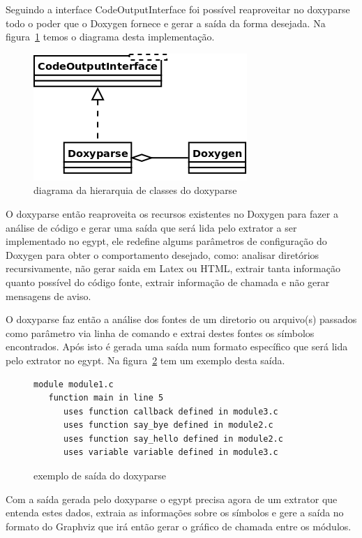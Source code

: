 Seguindo a interface CodeOutputInterface foi possível reaproveitar no doxyparse
todo o poder que o Doxygen fornece e gerar a saída da forma desejada. Na
figura~\ref{doxyparse-diagram} temos o diagrama desta implementação.

\begin{figure}[h]
\center
\includegraphics[scale=0.4]{imagens/doxyparse-diagram}
\caption{diagrama da hierarquia de classes do doxyparse}
\label{doxyparse-diagram}
\end{figure}

O doxyparse então reaproveita os recursos existentes no Doxygen para fazer a
análise de código e gerar uma saída que será lida pelo extrator a ser
implementado no egypt, ele redefine algums parâmetros de configuração
do Doxygen para obter o comportamento desejado, como: analisar diretórios
recursivamente, não gerar saida em Latex ou HTML, extrair tanta informação
quanto possível do código fonte, extrair informação de chamada e não gerar
mensagens de aviso.

O doxyparse faz então a análise dos fontes de um diretorio ou arquivo(s)
passados como parâmetro via linha de comando e extrai destes fontes os símbolos
encontrados. Após isto é gerada uma saída num formato específico que será lida
pelo extrator no egypt. Na figura~\ref{exemplo-saida-doxyparse} tem um exemplo
desta saída.

\begin{figure}[h]
\begin{Verbatim}[frame=single,fontsize=\relsize{-2},fontfamily=courier]
module module1.c
   function main in line 5
      uses function callback defined in module3.c
      uses function say_bye defined in module2.c
      uses function say_hello defined in module2.c
      uses variable variable defined in module3.c
\end{Verbatim}
\caption{exemplo de saída do doxyparse}
\label{exemplo-saida-doxyparse}
\end{figure}

Com a saída gerada pelo doxyparse o egypt precisa agora de um extrator que
entenda estes dados, extraia as informações sobre os símbolos e gere a saída no
formato do Graphviz que irá então gerar o gráfico de chamada entre os módulos.

